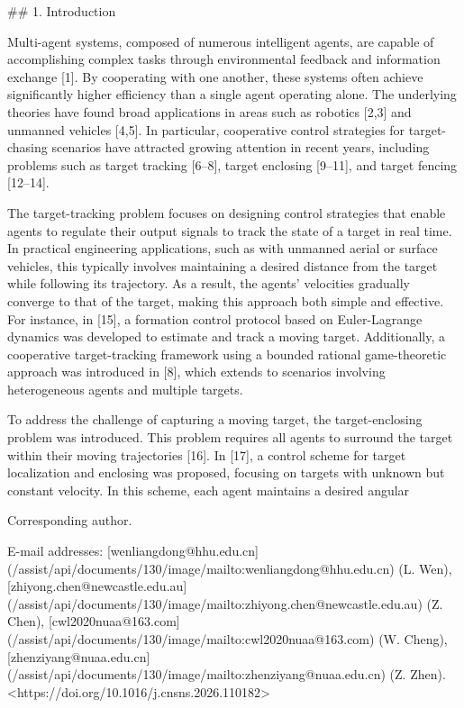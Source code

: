 ## 1. Introduction

Multi-agent systems, composed of numerous intelligent agents, are capable of accomplishing complex tasks through environmental feedback and information exchange [1]. By cooperating with one another, these systems often achieve significantly higher efficiency than a single agent operating alone. The underlying theories have found broad applications in areas such as robotics [2,3] and unmanned vehicles [4,5]. In particular, cooperative control strategies for target-chasing scenarios have attracted growing attention in recent years, including problems such as target tracking [6–8], target enclosing [9–11], and target fencing [12–14].

The target-tracking problem focuses on designing control strategies that enable agents to regulate their output signals to track the state of a target in real time. In practical engineering applications, such as with unmanned aerial or surface vehicles, this typically involves maintaining a desired distance from the target while following its trajectory. As a result, the agents' velocities gradually converge to that of the target, making this approach both simple and effective. For instance, in [15], a formation control protocol based on Euler-Lagrange dynamics was developed to estimate and track a moving target. Additionally, a cooperative target-tracking framework using a bounded rational game-theoretic approach was introduced in [8], which extends to scenarios involving heterogeneous agents and multiple targets.

To address the challenge of capturing a moving target, the target-enclosing problem was introduced. This problem requires all agents to surround the target within their moving trajectories [16]. In [17], a control scheme for target localization and enclosing was proposed, focusing on targets with unknown but constant velocity. In this scheme, each agent maintains a desired angular

\* Corresponding author.

E-mail addresses: [wenliangdong@hhu.edu.cn](/assist/api/documents/130/image/mailto:wenliangdong@hhu.edu.cn) (L. Wen), [zhiyong.chen@newcastle.edu.au](/assist/api/documents/130/image/mailto:zhiyong.chen@newcastle.edu.au) (Z. Chen), [cwl2020nuaa@163.com](/assist/api/documents/130/image/mailto:cwl2020nuaa@163.com) (W. Cheng), [zhenziyang@nuaa.edu.cn](/assist/api/documents/130/image/mailto:zhenziyang@nuaa.edu.cn) (Z. Zhen).<https://doi.org/10.1016/j.cnsns.2026.110182>


